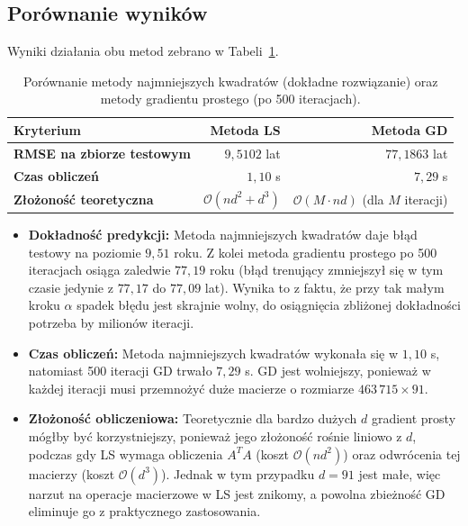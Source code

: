\documentclass[12pt, a4paper]{article}
\begin{document}
\subsection{Porównanie wyników}
Wyniki działania obu metod zebrano w Tabeli~\ref{tab:tabela2}.

\begin{table}[H]
  \centering
  \caption{Porównanie metody najmniejszych kwadratów (dokładne rozwiązanie) oraz metody gradientu prostego (po 500 iteracjach).}
  \label{tab:tabela2}
  \begin{tabular}{lrr}
    \toprule
    Kryterium & Metoda LS & Metoda GD \\
    \midrule
    \textbf{RMSE na zbiorze testowym} & $9{,}5102$ lat & $77{,}1863$ lat \\
    \textbf{Czas obliczeń} & $1{,}10$ s & $7{,}29$ s \\
    \textbf{Złożoność teoretyczna} & $\mathcal{O}(n d^2 + d^3)$ & $\mathcal{O}(M \cdot n d)$ (dla $M$ iteracji) \\
    \bottomrule
  \end{tabular}
\end{table}

\begin{itemize}
  \item \textbf{Dokładność predykcji:} Metoda najmniejszych kwadratów daje błąd testowy na poziomie $9{,}51$ roku. Z kolei metoda gradientu prostego po 500 iteracjach osiąga zaledwie $77{,}19$ roku (błąd trenujący zmniejszył się w tym czasie jedynie z $77{,}17$ do $77{,}09$ lat). Wynika to z faktu, że przy tak małym kroku $\alpha$ spadek błędu jest skrajnie wolny, do osiągnięcia zbliżonej dokładności potrzeba by milionów iteracji.
  \item \textbf{Czas obliczeń:} Metoda najmniejszych kwadratów wykonała się w $1{,}10$ s, natomiast 500 iteracji GD trwało $7{,}29$ s. GD jest wolniejszy, ponieważ w każdej iteracji musi przemnożyć duże macierze o rozmiarze $463\,715 \times 91$.
  \item \textbf{Złożoność obliczeniowa:} Teoretycznie dla bardzo dużych $d$ gradient prosty mógłby być korzystniejszy, ponieważ jego złożoność rośnie liniowo z $d$, podczas gdy LS wymaga obliczenia $A^T A$ (koszt $\mathcal{O}(n d^2)$) oraz odwrócenia tej macierzy (koszt $\mathcal{O}(d^3)$). Jednak w tym przypadku $d = 91$ jest małe, więc narzut na operacje macierzowe w LS jest znikomy, a powolna zbieżność GD eliminuje go z praktycznego zastosowania.
\end{itemize}
\end{document}
